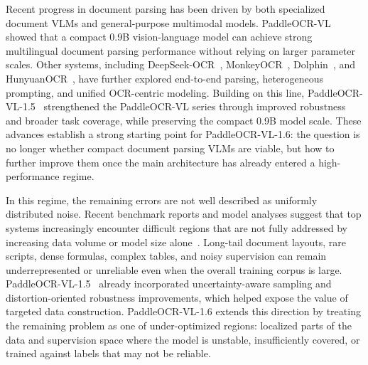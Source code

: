 \documentclass[11pt, a4paper,logo,  copyright, nonumbering]{paddleocr}
\begin{document}
Recent progress in document parsing has been driven by both specialized document VLMs and general-purpose multimodal models. PaddleOCR-VL~\cite{cui2025paddleocrvl} showed that a compact 0.9B vision-language model can achieve strong multilingual document parsing performance without relying on larger parameter scales. Other systems, including DeepSeek-OCR~\cite{wei2025deepseek}, MonkeyOCR~\cite{li2025monkeyocr}, Dolphin~\cite{feng2025dolphin}, and HunyuanOCR~\cite{hunyuanvisionteam2025hunyuanocrtechnicalreport}, have further explored end-to-end parsing, heterogeneous prompting, and unified OCR-centric modeling. Building on this line, PaddleOCR-VL-1.5~\cite{cui2026paddleocrvl15multitask09bvlm} strengthened the PaddleOCR-VL series through improved robustness and broader task coverage, while preserving the compact 0.9B model scale. These advances establish a strong starting point for PaddleOCR-VL-1.6: the question is no longer whether compact document parsing VLMs are viable, but how to further improve them once the main architecture has already entered a high-performance regime.

In this regime, the remaining errors are not well described as uniformly distributed noise. Recent benchmark reports and model analyses suggest that top systems increasingly encounter difficult regions that are not fully addressed by increasing data volume or model size alone~\cite{cui2025paddleocrvl,niu2025mineru2,ouyang2025omnidocbench}. Long-tail document layouts, rare scripts, dense formulas, complex tables, and noisy supervision can remain underrepresented or unreliable even when the overall training corpus is large. PaddleOCR-VL-1.5~\cite{cui2026paddleocrvl15multitask09bvlm} already incorporated uncertainty-aware sampling and distortion-oriented robustness improvements, which helped expose the value of targeted data construction. PaddleOCR-VL-1.6 extends this direction by treating the remaining problem as one of under-optimized regions: localized parts of the data and supervision space where the model is unstable, insufficiently covered, or trained against labels that may not be reliable.
\end{document}
